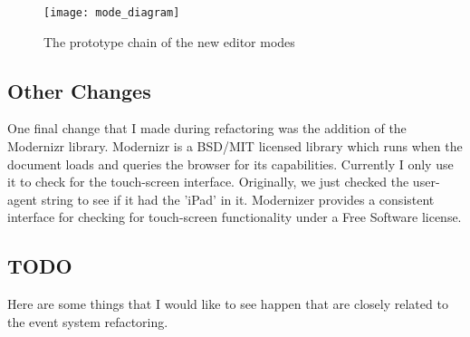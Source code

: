\documentclass[letterpaper]{article}
\begin{document}
\begin{figure}[h]
    \begin{center}
        \texttt{[image: mode\_diagram]}
    \end{center}
    \caption{The prototype chain of the new editor modes}
    \label{fig:modes}
\end{figure}

\subsection*{Other Changes}

One final change that I made during refactoring was the addition of the
Modernizr library. Modernizr is a BSD/MIT licensed library which runs when the
document loads and queries the browser for its capabilities. Currently I only use it to
check for the touch-screen interface. Originally, we just checked the user-agent
string to see if it had the 'iPad' in it. Modernizer provides a consistent
interface for checking for touch-screen functionality under a Free Software
license.

\subsection*{TODO}
Here are some things that I would like to see happen that are closely related to
the event system refactoring.
\end{document}
